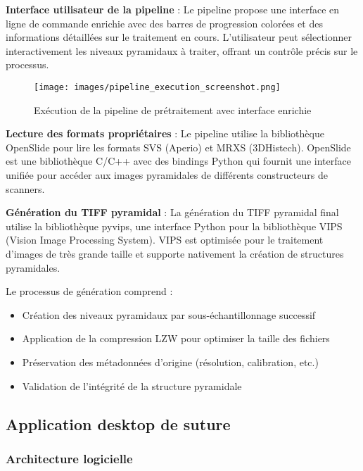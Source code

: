 \documentclass[12pt,a4paper]{report}
\begin{document}
\begin{}
\begin{}
\begin{}
\begin{}
\textbf{Interface utilisateur de la pipeline} : Le pipeline propose une interface en ligne de commande enrichie avec des barres de progression colorées et des informations détaillées sur le traitement en cours. L'utilisateur peut sélectionner interactivement les niveaux pyramidaux à traiter, offrant un contrôle précis sur le processus.

\begin{figure}[H]
\centering
\texttt{[image: images/pipeline\_execution\_screenshot.png]}
\caption{Exécution de la pipeline de prétraitement avec interface enrichie}
\label{fig:pipeline_execution}
\end{figure}

\textbf{Lecture des formats propriétaires} : Le pipeline utilise la bibliothèque OpenSlide pour lire les formats SVS (Aperio) et MRXS (3DHistech). OpenSlide est une bibliothèque C/C++ avec des bindings Python qui fournit une interface unifiée pour accéder aux images pyramidales de différents constructeurs de scanners.

\textbf{Génération du TIFF pyramidal} : La génération du TIFF pyramidal final utilise la bibliothèque pyvips, une interface Python pour la bibliothèque VIPS (Vision Image Processing System). VIPS est optimisée pour le traitement d'images de très grande taille et supporte nativement la création de structures pyramidales.

Le processus de génération comprend :
\begin{itemize}
\item Création des niveaux pyramidaux par sous-échantillonnage successif
\item Application de la compression LZW pour optimiser la taille des fichiers
\item Préservation des métadonnées d'origine (résolution, calibration, etc.)
\item Validation de l'intégrité de la structure pyramidale
\end{itemize}

\subsection{Application desktop de suture}

\subsubsection{Architecture logicielle}


\end{}
\end{}
\end{}
\end{}
\end{document}
